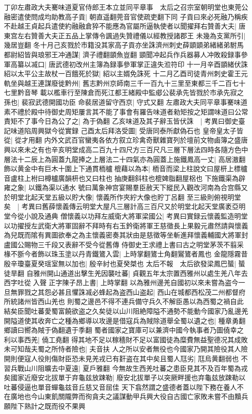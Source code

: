 丁卯左肅政大夫騫味道夏官侍郎王本立並同平章事　太后之召宗室朝明堂也東莞公融密遣使問成均助教高子貢|{
	朝直遥翻莞音官使疏吏翻下同}
子貢曰來必死融乃稱疾不赴越王貞起兵遣使約融融倉猝不能應為官屬所逼執使者以聞擢拜右贊善大夫|{
	唐東宫左右贊善大夫正五品上掌傳令諷過失贊禮儀以經教授諸郡王}
未幾為支黨所引|{
	幾居豈翻}
冬十月己亥戮於市籍没其家高子貢亦坐誅濟州刺史薛顗顗弟緒緒弟駙馬都尉紹皆與琅邪王冲通謀|{
	濟子禮翻顗魚豈翻}
顗聞冲起兵作兵器募人冲敗殺録事參軍高纂以㓕口|{
	唐武德初改州主簿為録事參軍掌正違失涖符印}
十一月辛酉顗緒伏誅紹以太平公主故杖一百餓死於獄|{
	紹以主婿免誅死}
十二月乙酉司徒青州刺史霍王元軌坐與越王連謀廢徙黔州|{
	舊志黔州京師南三千一百九十三里至東都三千二百七十七里黔音琴}
載以檻車行至陳倉而死江都王緒殿中監郕公裴承先皆戮於市承先寂之孫也|{
	裴寂武德開國功臣}
命裴居道留守西京|{
	守式又翻}
左肅政大夫同平章事騫味道素不禮於殿中待御史周矩屢言其不能了事會有羅告味道者勑矩按之矩謂味道曰公常責矩不了事今日為公了之|{
	為于偽翻}
乙亥味道及其子辭玉皆伏誅　|{
	考異曰御史臺記味道陷周興獄今從實録}
己酉太后拜洛受圖|{
	受唐同泰所獻偽石也}
皇帝皇太子皆從|{
	從才用翻}
内外文武百官蠻夷各依方叙立珍禽奇獸雜寶列於壇前文物鹵簿之盛唐興以來未之有也辛亥明堂成高二百九十四尺方三百尺凡三層下層法四時各隨方色中層法十二辰上為圓蓋九龍捧之上層法二十四氣亦為圓蓋上施鐵鳳高一丈|{
	高居滶翻}
飾以黄金中有巨木十圍上下通貫栭櫨㮰藉以為本|{
	栭音而梁上柱說文曰屋枅上標櫨音盧柱上柎曰樽櫨廣韻枅也又曰柱也抽庚翻斜柱也㮰婢脂翻屋梠也}
下施鐵渠為辟雍之象|{
	以鐵為渠以通水}
號曰萬象神宫宴賜羣臣赦天下縱民入觀改河南為合宫縣又於明堂北起天堂五級以貯大像|{
	懷義所作夾紵大像也貯丁呂翻}
至三級則俯視明堂矣　|{
	考異曰舊薛懷義傳云明堂大屋凡三層計高三百尺又於明堂北起天堂廣袤亞明堂今從小說及通典}
僧懷義以功拜左威衛大將軍梁國公|{
	考異曰實録云懷義監造明堂以功擢授左武衛大將軍固辭不拜時有右玉鈐衛將軍王慈徵長上果毅元肅然請與懷義為兒既而隂有異圖欲奉之為主懷義密奏其狀由是慈徵等坐斬進拜懷義輔國大將軍封盧國公賜物三千段又表辭不受今從舊傳}
侍御史王求禮上書曰古之明堂茅茨不翦采椽不斵今者飾以珠玉塗以丹青鐵鷟入雲|{
	上時掌翻鷟士角翻鸑鷟者鳳也}
金龍隱霧昔殷辛瓊臺夏癸瑶室無以加也|{
	殷辛紂也夏癸桀也}
太后不報　太后欲發梁鳳巴蜑|{
	蜑徒旱翻}
自雅州開山通道出擊生羌因襲吐蕃|{
	貞觀五年太宗置西雅州以處生羌八年去西字吐從入聲}
正字陳子昂上書|{
	上時掌翻}
以為雅州邊羌自國初以來未嘗為盗今一旦無罪戮之其怨必甚且懼誅㓕必蜂起為盗西山盗起|{
	西山在城都西松茂二州都督府所統諸州皆西山羌也}
則蜀之邊邑不得不連兵備守兵久不解臣愚以為西蜀之禍自此結矣臣聞吐蕃愛蜀富饒欲盗之久矣徒以山川阻絶障隘不通勢不能動今國家乃亂邊羌開隘道使其收奔亡之種為鄉導以攻邊是借寇兵為賊除道舉全蜀以遺之也|{
	種章勇翻鄉讀曰嚮為賊于偽翻遺于季翻}
蜀者國家之寶庫可以兼濟中國今執事者乃圖僥幸之利以事西羌|{
	僥工堯翻}
得其地不足以稼穡財不足以富國徒為糜費無益聖德况其成敗未可知哉夫蜀之所恃者險也|{
	夫音扶}
人之所以安者無役也今國家乃開其險役其人險開則便寇人役則傷財臣恐未見羌戎已有姧盗在其中矣且蜀人尫劣|{
	尫烏黄翻弱也}
不習兵戰山川阻曠去中夏遠|{
	夏戶雅翻}
今無故生西羌吐蕃之患臣見其不及百年蜀為戎矣國家近廢安北拔單于弃龜兹放踈勒|{
	廢安北拔單子以突厥畔援也弃龜兹放踈勒以吐蕃侵逼也單音蟬龜兹音丘慈又音屈佳}
天下翕然謂之盛德者蓋以陛下務在養人不在廣地也今山東飢關隴弊而徇貪夫之議謀動甲兵興大役自古國亡家敗未嘗不由黷兵願陛下熟計之既而役不果興

